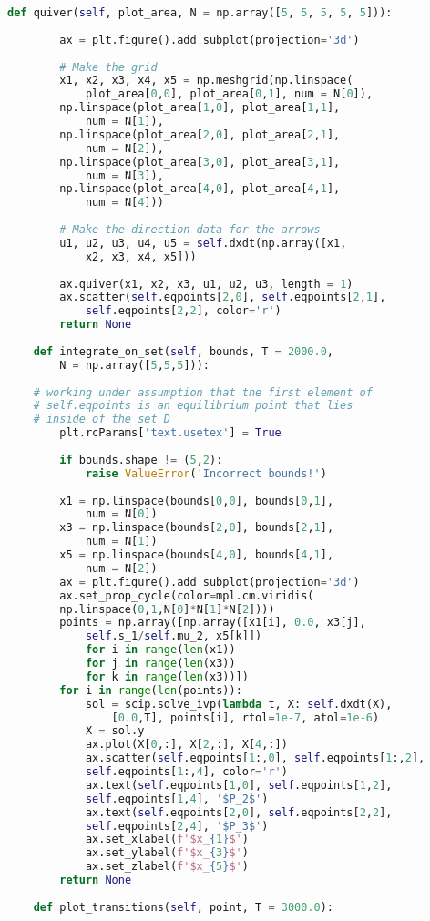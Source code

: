 \begin{lstlisting}[language=Python, showstringspaces=false, caption=Файл \texttt{model.py}.]
	def quiver(self, plot_area, N = np.array([5, 5, 5, 5, 5])):
		
		ax = plt.figure().add_subplot(projection='3d')
		
		# Make the grid
		x1, x2, x3, x4, x5 = np.meshgrid(np.linspace(
			plot_area[0,0], plot_area[0,1], num = N[0]),
		np.linspace(plot_area[1,0], plot_area[1,1],
			num = N[1]),
		np.linspace(plot_area[2,0], plot_area[2,1],
			num = N[2]),
		np.linspace(plot_area[3,0], plot_area[3,1],
			num = N[3]),
		np.linspace(plot_area[4,0], plot_area[4,1],
			num = N[4]))
		
		# Make the direction data for the arrows
		u1, u2, u3, u4, u5 = self.dxdt(np.array([x1,
			x2, x3, x4, x5])) 
		
		ax.quiver(x1, x2, x3, u1, u2, u3, length = 1)
		ax.scatter(self.eqpoints[2,0], self.eqpoints[2,1], 
			self.eqpoints[2,2], color='r')
		return None
		
	def integrate_on_set(self, bounds, T = 2000.0, 
		N = np.array([5,5,5])):
		
	# working under assumption that the first element of 
	# self.eqpoints is an equilibrium point that lies 
	# inside of the set D 
		plt.rcParams['text.usetex'] = True
		
		if bounds.shape != (5,2):
			raise ValueError('Incorrect bounds!')
		
		x1 = np.linspace(bounds[0,0], bounds[0,1], 
			num = N[0])
		x3 = np.linspace(bounds[2,0], bounds[2,1], 
			num = N[1])
		x5 = np.linspace(bounds[4,0], bounds[4,1], 
			num = N[2])
		ax = plt.figure().add_subplot(projection='3d')
		ax.set_prop_cycle(color=mpl.cm.viridis(
		np.linspace(0,1,N[0]*N[1]*N[2])))
		points = np.array([np.array([x1[i], 0.0, x3[j], 
			self.s_1/self.mu_2, x5[k]]) 
			for i in range(len(x1)) 
			for j in range(len(x3))  
			for k in range(len(x3))])
		for i in range(len(points)):
			sol = scip.solve_ivp(lambda t, X: self.dxdt(X), 
				[0.0,T], points[i], rtol=1e-7, atol=1e-6)
			X = sol.y
			ax.plot(X[0,:], X[2,:], X[4,:])    
			ax.scatter(self.eqpoints[1:,0], self.eqpoints[1:,2], 
			self.eqpoints[1:,4], color='r')
			ax.text(self.eqpoints[1,0], self.eqpoints[1,2], 
			self.eqpoints[1,4], '$P_2$')
			ax.text(self.eqpoints[2,0], self.eqpoints[2,2], 
			self.eqpoints[2,4], '$P_3$')
			ax.set_xlabel(f'$x_{1}$')
			ax.set_ylabel(f'$x_{3}$')
			ax.set_zlabel(f'$x_{5}$')
		return None
		
	def plot_transitions(self, point, T = 3000.0):
		

\end{lstlisting}
